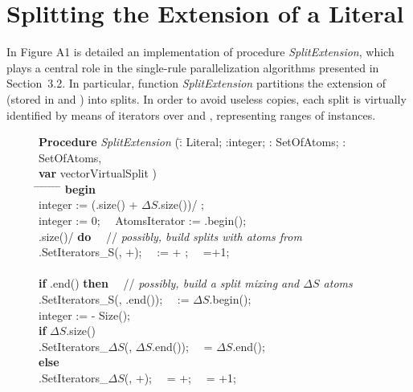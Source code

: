 \documentclass[preprint]{tlp}
\newcommand{\DNF}{\ensuremath{\Delta S}\xspace}
\begin{document}
\clearpage{}\appendix
\section{Splitting the Extension of a Literal}\label{app:split}
In Figure A1 is detailed an implementation of procedure {\em SplitExtension}, 
which plays a central role in the single-rule parallelization algorithms presented in Section~3.2.
In particular, function {\em SplitExtension} partitions the
extension of  (stored in  and ) into   splits.
In order to avoid useless copies, each split is virtually identified by means of
iterators over  and , representing ranges of instances.

\begin{figure}[h!]
\begin{tabbing}\footnotesize
{\bf Procedure} {\em SplitExtension \/}(\= : Literal; :integer; : SetOfAtoms; : SetOfAtoms, \\
\hspace*{1.2cm} {\bf var} vectorVirtualSplit )\\
\hspace*{0.2cm} \= \kill
\hspace*{0.4cm} \= \hspace*{0.4cm} \= \hspace*{0.4cm} \=
\hspace*{0.4cm} \= \hspace*{0.4cm} \= \hspace*{3cm} \=\kill
{\bf begin} \\
\> integer :=   (.size() + \DNF.size())/  ; \\
\> integer := 0; \ \  AtomsIterator  := .begin(); \\
   .size()/ {\bf do} \ \ // {\em possibly, build splits with atoms from }\\
\>\> [].SetIterators\_S(, +); \ \  :=  + ; \ \ =+1;\\
\\
\> {\bf if}   .end() {\bf then} \ \ // {\em possibly, build a split mixing  and \DNF atoms} \\
\>\> [].SetIterators\_S(, .end()); \ \  := \DNF.begin(); \\
\>\> integer  :=  - Size(); \\
\>\> {\bf if} \DNF.size()   \\
\>\>\> [].SetIterators\_\DNF(, \DNF.end()); \ \   = \DNF.end();\\
\>\> {\bf else}\\
\>\>\> [].SetIterators\_\DNF(, +); \ \   = +; \ \  = +1;\\

\end{tabbing}
\end{figure}
\end{document}
